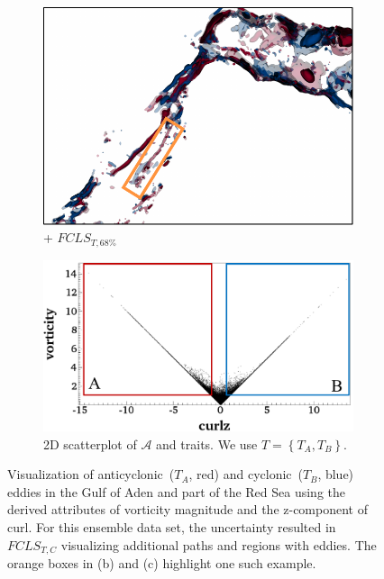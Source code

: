 \begin{figure}[!h]
\begin{subfigure}{0.245\linewidth}
\includegraphics[width=\linewidth]{Images/RedSeaEddy/fcls_68.pdf}
\vspace{-3mm}
\caption{+ $FCLS_{T,68\%}$}
\label{fig:rse_fcls}
\end{subfigure}
\hfill
\begin{subfigure}{0.24\linewidth}
\centering
\includegraphics[width=0.95\linewidth]{Images/RedSeaEddy/scatterplot.pdf}
\vspace{-2mm}
\caption{2D scatterplot of $\mathcal{A}$ and traits. We use $T = \left\{T_{A}, T_{B}\right\}$.} 
\label{fig:rse_scatterplot}
\end{subfigure}
\vspace{-2mm}
\caption{Visualization of anticyclonic~($T_{A}$, red) and cyclonic~($T_{B}$, blue) eddies in the Gulf of Aden and part of the Red Sea using the derived attributes of vorticity magnitude and the z-component of curl. For this ensemble data set, the uncertainty resulted in $FCLS_{T,C}$ visualizing additional paths and regions with eddies. The orange boxes in (b) and (c) highlight one such example.}
\label{fig:rse}
\end{figure}
